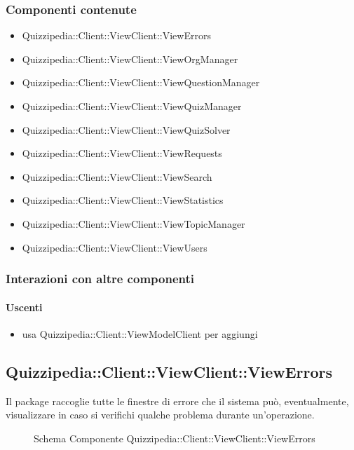 \subsubsection{Componenti contenute}
\begin{itemize}
\item Quizzipedia::Client::ViewClient::ViewErrors
\item Quizzipedia::Client::ViewClient::ViewOrgManager
\item Quizzipedia::Client::ViewClient::ViewQuestionManager
\item Quizzipedia::Client::ViewClient::ViewQuizManager
\item Quizzipedia::Client::ViewClient::ViewQuizSolver
\item Quizzipedia::Client::ViewClient::ViewRequests
\item Quizzipedia::Client::ViewClient::ViewSearch
\item Quizzipedia::Client::ViewClient::ViewStatistics
\item Quizzipedia::Client::ViewClient::ViewTopicManager
\item Quizzipedia::Client::ViewClient::ViewUsers
\end{itemize}
\subsubsection{Interazioni con altre componenti}
\paragraph{Uscenti}
\begin{itemize}
\item usa Quizzipedia::Client::ViewModelClient per aggiungi
\end{itemize}
\subsection{Quizzipedia::Client::ViewClient::ViewErrors}
Il package raccoglie tutte le finestre di errore che il sistema può, eventualmente, visualizzare in caso si verifichi qualche problema durante un'operazione.
\begin{figure}[H]
\centering
\noindent{}
\caption[Schema Componente Quizzipedia::Client::ViewClient::ViewErrors]{Schema Componente Quizzipedia::Client::ViewClient::ViewErrors}
\end{figure}
